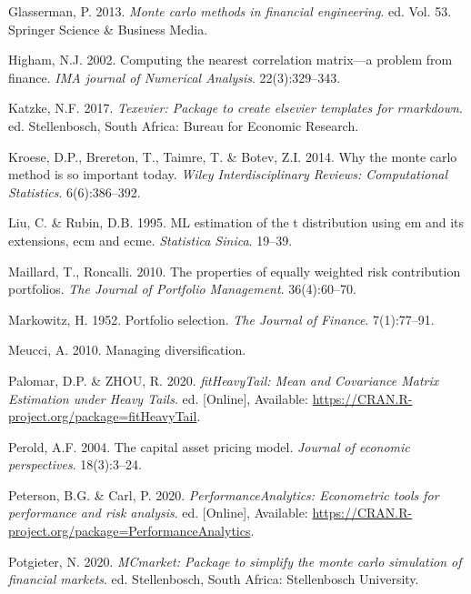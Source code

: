\documentclass[11pt,preprint, authoryear]{elsarticle}
\numberwithin{equation}{section}
\numberwithin{figure}{section}
\numberwithin{table}{section}
\begin{document}
\leavevmode\hypertarget{ref-glasserman2013}{}%
Glasserman, P. 2013. \emph{Monte carlo methods in financial
engineering}. ed. Vol. 53. Springer Science \& Business Media.

\leavevmode\hypertarget{ref-higham2002}{}%
Higham, N.J. 2002. Computing the nearest correlation matrix---a problem
from finance. \emph{IMA journal of Numerical Analysis}. 22(3):329--343.

\leavevmode\hypertarget{ref-Texevier}{}%
Katzke, N.F. 2017. \emph{Texevier: Package to create elsevier templates
for rmarkdown}. ed. Stellenbosch, South Africa: Bureau for Economic
Research.

\leavevmode\hypertarget{ref-kroese2014}{}%
Kroese, D.P., Brereton, T., Taimre, T. \& Botev, Z.I. 2014. Why the
monte carlo method is so important today. \emph{Wiley Interdisciplinary
Reviews: Computational Statistics}. 6(6):386--392.

\leavevmode\hypertarget{ref-liu1995}{}%
Liu, C. \& Rubin, D.B. 1995. ML estimation of the t distribution using
em and its extensions, ecm and ecme. \emph{Statistica Sinica}. 19--39.

\leavevmode\hypertarget{ref-maillard2010}{}%
Maillard, T., Roncalli. 2010. The properties of equally weighted risk
contribution portfolios. \emph{The Journal of Portfolio Management}.
36(4):60--70.

\leavevmode\hypertarget{ref-markowitz}{}%
Markowitz, H. 1952. Portfolio selection. \emph{The Journal of Finance}.
7(1):77--91.

\leavevmode\hypertarget{ref-meucci2010}{}%
Meucci, A. 2010. Managing diversification.

\leavevmode\hypertarget{ref-fitHeavyTail}{}%
Palomar, D.P. \& ZHOU, R. 2020. \emph{fitHeavyTail: Mean and Covariance
Matrix Estimation under Heavy Tails}. ed. {[}Online{]}, Available:
\url{https://CRAN.R-project.org/package=fitHeavyTail}.

\leavevmode\hypertarget{ref-perold2004}{}%
Perold, A.F. 2004. The capital asset pricing model. \emph{Journal of
economic perspectives}. 18(3):3--24.

\leavevmode\hypertarget{ref-PerformanceAnalytics}{}%
Peterson, B.G. \& Carl, P. 2020. \emph{PerformanceAnalytics: Econometric
tools for performance and risk analysis}. ed. {[}Online{]}, Available:
\url{https://CRAN.R-project.org/package=PerformanceAnalytics}.

\leavevmode\hypertarget{ref-MCmarket}{}%
Potgieter, N. 2020. \emph{MCmarket: Package to simplify the monte carlo
simulation of financial markets}. ed. Stellenbosch, South Africa:
Stellenbosch University.
\end{document}
